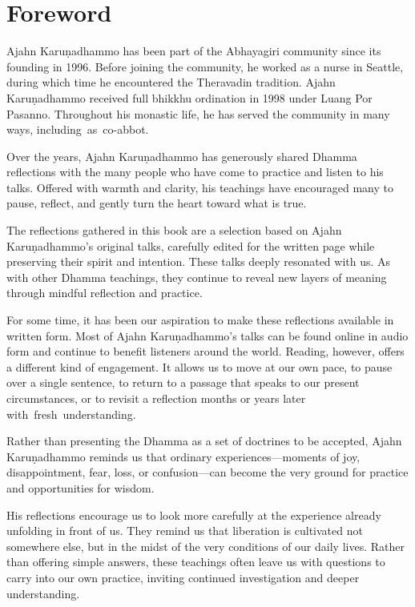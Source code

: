 \chapter{Foreword}

Ajahn Karuṇadhammo has been part of the Abhayagiri community since its founding in 1996. Before joining the community, he worked as a nurse in Seattle, during which time he encountered the Theravadin tradition. Ajahn Karuṇadhammo received full bhikkhu ordination in 1998 under Luang Por Pasanno. Throughout his monastic life, he has served the community in many ways, \mbox{including as co-abbot.}

Over the years, Ajahn Karuṇadhammo has generously shared Dhamma reflections with the many people who have come to practice and listen to his talks. Offered with warmth and clarity, his teachings have encouraged many to pause, reflect, and gently turn the heart toward what is true.

The reflections gathered in this book are a selection based on Ajahn Karuṇadhammo's original talks, carefully edited for the written page while preserving their spirit and intention. These talks deeply resonated with us. As with other Dhamma teachings, they continue to reveal new layers of meaning through mindful reflection and practice.

For some time, it has been our aspiration to make these reflections available in written form. Most of Ajahn Karuṇadhammo's talks can be found online in audio form and continue to benefit listeners around the world. Reading, however, offers a different kind of engagement. It allows us to move at our own pace, to pause over a single sentence, to return to a passage that speaks to our present circumstances, or to revisit a reflection months or years later \mbox{with fresh understanding.}

Rather than presenting the Dhamma as a set of doctrines to be accepted, Ajahn Karuṇadhammo reminds us that ordinary experiences---moments of joy, disappointment, fear, loss, or confusion---can become the very ground for practice and opportunities for wisdom.

His reflections encourage us to look more carefully at the experience already unfolding in front of us. They remind us that liberation is cultivated not somewhere else, but in the midst of the very conditions of our daily lives. Rather than offering simple answers, these teachings often leave us with questions to carry into our own practice, inviting continued investigation and deeper understanding.

